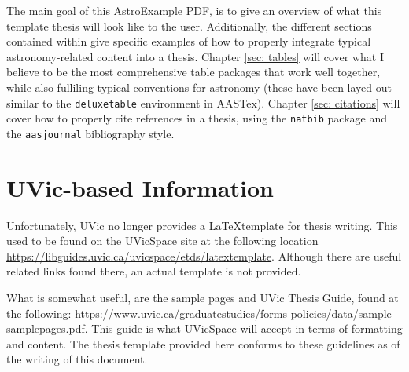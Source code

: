\label{sec: intro}

The main goal of this AstroExample PDF, is to give an overview of what this template thesis will look like to the user. Additionally, the different sections contained within give specific examples of how to properly integrate typical astronomy-related content into a thesis. Chapter \ref{sec: tables} will cover what I believe to be the most comprehensive table packages that work well together, while also fulliling typical conventions for astronomy (these have been layed out similar to the \texttt{deluxetable} environment in AASTex). Chapter \ref{sec: citations} will cover how to properly cite references in a thesis, using the \texttt{natbib} package and the \texttt{aasjournal} bibliography style.

\section{UVic-based Information}

Unfortunately, UVic no longer provides a \LaTeX template for thesis writing. This used to be found on the UVicSpace site at the following location \url{https://libguides.uvic.ca/uvicspace/etds/latextemplate}. Although there are useful related links found there, an actual template is not provided.

What is somewhat useful, are the sample pages and UVic Thesis Guide, found at the following: \url{https://www.uvic.ca/graduatestudies/forms-policies/data/sample-samplepages.pdf}. This guide is what UVicSpace will accept in terms of formatting and content. The thesis template provided here conforms to these guidelines as of the writing of this document.